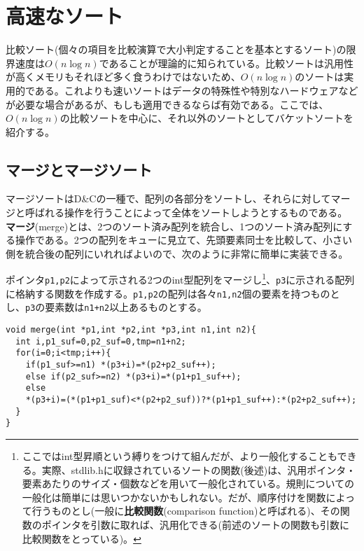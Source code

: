 \section{高速なソート}
比較ソート(個々の項目を比較演算で大小判定することを基本とするソート)の限界速度は$O(n\log n)$であることが理論的に知られている。比較ソートは汎用性が高くメモリもそれほど多く食うわけではないため、$O(n\log n)$のソートは実用的である。これよりも速いソートはデータの特殊性や特別なハードウェアなどが必要な場合があるが、もしも適用できるならば有効である。ここでは、$O(n\log n)$の比較ソートを中心に、それ以外のソートとしてバケットソートを紹介する。
\subsection{マージとマージソート}
マージソートはD\&Cの一種で、配列の各部分をソートし、それらに対してマージと呼ばれる操作を行うことによって全体をソートしようとするものである。
\textbf{マージ}(merge)とは、2つのソート済み配列を統合し、1つのソート済み配列にする操作である。2つの配列をキューに見立て、先頭要素同士を比較して、小さい側を統合後の配列にいれればよいので、次のように非常に簡単に実装できる。
\begin{boxnote}
ポインタ\verb|p1,p2|によって示される2つのint型配列をマージし\footnote{ここではint型昇順という縛りをつけて組んだが、より一般化することもできる。実際、stdlib.hに収録されているソートの関数(後述)は、汎用ポインタ・要素あたりのサイズ・個数などを用いて一般化されている。規則についての一般化は簡単には思いつかないかもしれない。だが、順序付けを関数によって行うものとし(一般に\textbf{比較関数}(comparison function)と呼ばれる)、その関数のポインタを引数に取れば、汎用化できる(前述のソートの関数も引数に比較関数をとっている)。}、\verb|p3|に示される配列に格納する関数を作成する。\verb|p1,p2|の配列は各々\verb|n1,n2|個の要素を持つものとし、\verb|p3|の要素数は\verb|n1+n2|以上あるものとする。
\end{boxnote}

\begin{boxnote}
\begin{lstlisting}[caption=マージ,label=program14_1]
void merge(int *p1,int *p2,int *p3,int n1,int n2){
  int i,p1_suf=0,p2_suf=0,tmp=n1+n2;
  for(i=0;i<tmp;i++){
    if(p1_suf>=n1) *(p3+i)=*(p2+p2_suf++);
    else if(p2_suf>=n2) *(p3+i)=*(p1+p1_suf++);
    else 
    *(p3+i)=(*(p1+p1_suf)<*(p2+p2_suf))?*(p1+p1_suf++):*(p2+p2_suf++);
  }
}  
\end{lstlisting}
\end{boxnote}

